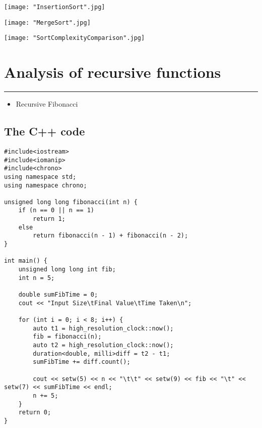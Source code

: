 \documentclass[a4paper, 12pt]{article}
\begin{document}
	\begin{center}
		\texttt{[image: "InsertionSort".jpg]}
	\end{center}
	
	\begin{center}
		\texttt{[image: "MergeSort".jpg]}		
	\end{center}
	
	\begin{center}
		\texttt{[image: "SortComplexityComparison".jpg]}		
	\end{center}

\section*{Analysis of recursive functions}
\noindent\rule{\textwidth}{1pt}
\begin{itemize}
	\item Recursive Fibonacci
\end{itemize}
\subsection*{The C++ code}
\begin{lstlisting}
#include<iostream>
#include<iomanip>
#include<chrono>
using namespace std;
using namespace chrono;

unsigned long long fibonacci(int n) {
	if (n == 0 || n == 1)
		return 1;
	else
		return fibonacci(n - 1) + fibonacci(n - 2);
}

int main() {
	unsigned long long int fib;
	int n = 5;

	double sumFibTime = 0;
	cout << "Input Size\tFinal Value\tTime Taken\n";

	for (int i = 0; i < 8; i++) {
		auto t1 = high_resolution_clock::now();
		fib = fibonacci(n);
		auto t2 = high_resolution_clock::now();
		duration<double, milli>diff = t2 - t1;
		sumFibTime += diff.count();

		cout << setw(5) << n << "\t\t" << setw(9) << fib << "\t" << setw(7) << sumFibTime << endl;
		n += 5;
	}
	return 0;
}
\end{lstlisting}
\end{document}
